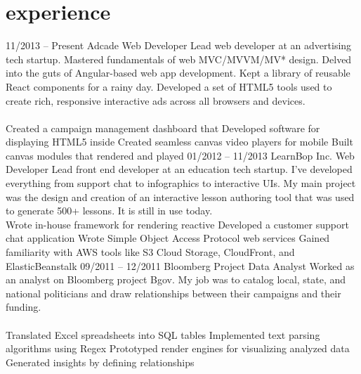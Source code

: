 \documentclass[]{friggeri-cv}
\begin{document}
\section{experience}
\tabentry
  {11/2013 – Present}
  {Adcade}
  {Web Developer}
  {Lead web developer at an advertising tech startup. Mastered fundamentals of web MVC/MVVM/MV* design. Delved into the guts of Angular-based web app development. Kept a library of reusable React components for a rainy day. Developed a set of HTML5 tools used to create rich, responsive interactive ads across all browsers and devices.\\%
  \\%
    \bulletlist
    {Created a campaign management dashboard that }
    {Developed software for displaying HTML5 inside }
    {Created seamless canvas video players for mobile }
    {Built canvas modules that rendered and played }
  }
\tabentry
  {01/2012 – 11/2013}
  {LearnBop Inc.}
  {Web Developer}
  {Lead front end developer at an education tech startup. I've developed everything from support chat to infographics to interactive UIs. My main project was the design and creation of an interactive lesson authoring tool that was used to generate 500+ lessons. It is still in use today.
  \\%
    \bulletlist
    {Wrote in-house framework for rendering reactive }
    {Developed a customer support chat application }
    {Wrote Simple Object Access Protocol web services }
    {Gained familiarity with AWS tools like S3 Cloud Storage, CloudFront, and ElasticBeanstalk}
  }
\pagebreak
\tabentry
  {09/2011 – 12/2011}
  {Bloomberg}
  {Project Data Analyst}
  {Worked as an analyst on Bloomberg project Bgov. My job was to catalog local, state, and national politicians and draw relationships between their campaigns and their funding.\\%
  \\%
    \bulletlist
    {Translated Excel spreadsheets into SQL tables}
    {Implemented text parsing algorithms using Regex}
    {Prototyped render engines for visualizing analyzed data}
    {Generated insights by defining relationships }
  }
\end{document}
